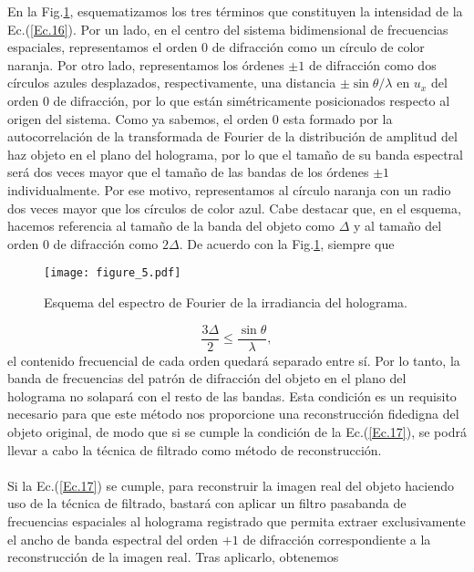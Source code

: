 \documentclass[12pt]{article}
\begin{document}
En la Fig.\ref{figura5}, esquematizamos los tres términos que constituyen la intensidad de la Ec.(\ref{Ec.16}). Por un lado, en el centro del sistema bidimensional de frecuencias espaciales, representamos el orden $0$ de difracción como un círculo de color naranja. Por otro lado, representamos los órdenes $\pm 1$ de difracción  como  dos círculos azules  desplazados, respectivamente, una distancia $\pm \sin{\theta}/\lambda$ en  $u_x$  del orden $0$ de difracción, por lo que están simétricamente posicionados respecto al origen del sistema. Como ya sabemos, el orden $0$ esta formado por la autocorrelación de la  transformada de Fourier de la  distribución de amplitud del haz objeto en el plano del holograma, por lo que el tamaño de su banda espectral será dos veces mayor que el tamaño  de las bandas de los órdenes $\pm 1$ individualmente. Por ese motivo,  representamos al círculo naranja  con un radio dos veces  mayor que los círculos de color azul. Cabe destacar que, en el esquema,  hacemos referencia al tamaño de la banda  del objeto como $\Delta$ y al tamaño del orden $0$ de difracción como $2\Delta$. De acuerdo con la Fig.\ref{figura5}, siempre que 
\begin{figure}[b!]
    \centering
    \texttt{[image: figure\_5.pdf]}\\
    \caption{Esquema del espectro de Fourier de la irradiancia del holograma.}
    \label{figura5} 
\end{figure}
\begin{equation}
    \frac{3 \Delta}{2} \leq \frac{\sin{\theta}}{\lambda},
    \label{Ec.17}
\end{equation}
el contenido frecuencial de cada orden quedará separado entre sí. Por lo tanto, la banda de frecuencias del patrón de difracción del objeto en el plano del holograma no solapará con el resto de las bandas. Esta condición es un requisito necesario para que este método nos proporcione una reconstrucción fidedigna del objeto original, de modo que si se cumple la condición de la Ec.(\ref{Ec.17}), se podrá llevar a cabo la técnica de filtrado como método de reconstrucción. \\\\
Si la Ec.(\ref{Ec.17}) se cumple, para  reconstruir la imagen real del objeto haciendo uso de la técnica de filtrado, bastará con aplicar un filtro pasabanda de frecuencias espaciales al holograma registrado que permita extraer exclusivamente el ancho de banda espectral del orden $+1$ de difracción correspondiente a la reconstrucción de la imagen real. Tras aplicarlo, obtenemos
\end{document}
